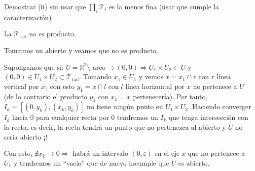 \begin{enun}
Demostrar (ii) sin usar que $\prod_{i} \mathcal{T}_i$ es la menos fina (usar que cumple la caracterización)
\end{enun}

\begin{ej}
La $\mathcal{T}_{\text{rad}}$ no es producto.
\begin{demo}
    Tomamos un abierto y veamos que no es producto. 

    Supongamos que sí:
    $U = \mathbb{R}^2 \setminus $ arco $\ni \left( 0, 0 \right) \Rightarrow U_1 \times U_2 \subset U$ y $\left( 0, 0 \right) \in U_1 \times U_2 \subset \mathcal{T}_{\text{rad}}$. Tomando $x_1 \in U_1$ y vemos $x = x_1 \cap r$ con $r$ línea vertical por $x_1$ con esto $y_1 = x \cap l$ con $l$ línea horizontal por $x$ no pertenece a $U$ (de lo contrario el producto $y_1$ con $x_1 = x$ pertenecería). Por tanto, $I_k = \left[ \left( 0, y_k \right), \left( x_k, y_k \right) \right]$ no tiene ningún punto en $U_1 \times U_2$. Haciendo converger $I_k$ hacía $0$ para cualquier recta por $0$ tendremos un $I_k$ que tenga intersección con la recta, es decir, la recta tendrá un punto que no pertenezca al abierto y $U$ no sería abierto ¡!

    Con esto, $\nexists x_k \rightarrow 0 \Rightarrow$ habrá un intervalo $\left( 0, \varepsilon \right)$ en el eje $x$ que no pertenece a $U_1$ y tendremos un ``vacío'' que de nuevo incumple que $U$ es abierto.
\end{demo}
\end{ej}

